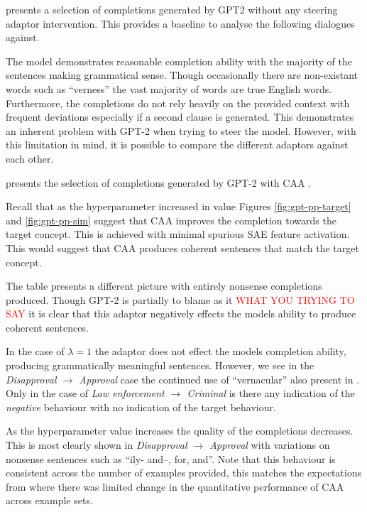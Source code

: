 

 presents a selection of completions generated by GPT2 \citep{gpt-2} without any steering adaptor intervention.
This provides a baseline to analyse the following dialogues against.

The model demonstrates reasonable completion ability with the majority of the sentences making grammatical sense.
Though occasionally there are non-existant words such as ``verness'' the vast majority of words are true English words.
Furthermore, the completions do not rely heavily on the provided context with frequent deviations especially if a second clause is generated.
This demonstrates an inherent problem with GPT-2 when trying to steer the model.
However, with this limitation in mind, it is possible to compare the different adaptors against each other.




 presents the selection of completions generated by GPT-2 with CAA \citep{caa}.

Recall that as the hyperparameter increased in value Figures \ref{fig:gpt-pp-target} and \ref{fig:gpt-pp-sim} suggest that CAA improves the completion towards the target concept.
This is achieved with minimal spurious SAE feature activation.
This would suggest that CAA produces coherent sentences that match the target concept.

The table presents a different picture with entirely nonsense completions produced.
Though GPT-2 is partially to blame as it \textcolor{red}{WHAT YOU TRYING TO SAY} it is clear that this adaptor negatively effects the models ability to produce coherent sentences.

In the case of $\lambda = 1$ the adaptor does not effect the models completion ability, producing grammatically meaningful sentences.
However, we see in the \emph{Disapproval $\to$ Approval} case the continued use of ``vernacular'' also present in .
Only in the case of \emph{Law enforcement $\to$ Criminal} is there any indication of the \emph{negative} behaviour with no indication of the target behaviour.

As the hyperparameter value increases the quality of the completions decreases.
This is most clearly shown in \emph{Disapproval $\to$ Approval} with variations on nonsense sentences such as ``ily- and--, for, and''.
Note that this behaviour is consistent across the number of examples provided, this matches the expectations from  where there was limited change in the quantitative performance of CAA across example sets.

